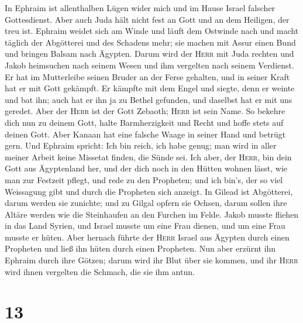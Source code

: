  In Ephraim ist allenthalben Lügen wider mich und im Hause
Israel falscher Gottesdienst. Aber auch Juda hält nicht fest an Gott und
an dem Heiligen, der treu ist.  Ephraim weidet sich am
Winde und läuft dem Ostwinde nach und macht täglich der Abgötterei und
des Schadens mehr; sie machen mit Assur einen Bund und bringen Balsam
nach Ägypten.  Darum wird der \textsc{Herr} mit Juda
rechten und Jakob heimsuchen nach seinem Wesen und ihm vergelten nach
seinem Verdienst.  Er hat im Mutterleibe seinen Bruder an
der Ferse gehalten, und in seiner Kraft hat er mit Gott gekämpft.
 Er kämpfte mit dem Engel und siegte, denn er weinte und
bat ihn; auch hat er ihn ja zu Bethel gefunden, und daselbst hat er mit
uns geredet.  Aber der \textsc{Herr} ist der Gott Zebaoth;
\textsc{Herr} ist sein Name.  So bekehre dich nun zu
deinem Gott, halte Barmherzigkeit und Recht und hoffe stets auf deinen
Gott.  Aber Kanaan hat eine falsche Waage in seiner Hand
und betrügt gern.  Und Ephraim spricht: Ich bin reich, ich
habe genug; man wird in aller meiner Arbeit keine Missetat finden, die
Sünde sei.  Ich aber, der \textsc{Herr}, bin dein Gott
aus Ägyptenland her, und der dich noch in den Hütten wohnen lässt, wie
man zur Festzeit pflegt,  und rede zu den Propheten; und
ich bin's, der so viel Weissagung gibt und durch die Propheten sich
anzeigt.  In Gilead ist Abgötterei, darum werden sie
zunichte; und zu Gilgal opfern sie Ochsen, darum sollen ihre Altäre
werden wie die Steinhaufen an den Furchen im Felde. 
Jakob musste fliehen in das Land Syrien, und Israel musste um eine Frau
dienen, und um eine Frau musste er hüten.  Aber hernach
führte der \textsc{Herr} Israel aus Ägypten durch einen Propheten und
ließ ihn hüten durch einen Propheten.  Nun aber erzürnt
ihn Ephraim durch ihre Götzen; darum wird ihr Blut über sie kommen, und
ihr \textsc{Herr} wird ihnen vergelten die Schmach, die sie ihm antun.

\hypertarget{section-12}{%
\section{13}\label{section-12}}

